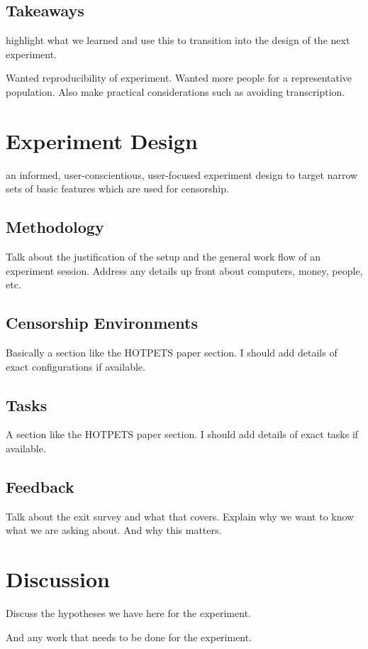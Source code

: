 \documentclass{sig-alternate-hotpets15}
\begin{document}
\subsection{Takeaways} 
highlight what we learned and use this to transition into 
the design of the next experiment. 

Wanted reproducibility of experiment.
Wanted more people for a representative population. 
Also make practical considerations such as avoiding transcription. 

\section{Experiment Design} 
an informed, user-conscientious, user-focused experiment design to target 
narrow sets of basic features which are used for censorship. 

\subsection{Methodology}  
Talk about the justification of the setup and the general 
work flow of an experiment session. Address any details up front
about computers, money, people, etc. 

\subsection{Censorship Environments} 
Basically a section like the HOTPETS paper section.
I should add details of exact configurations if available. 

\subsection{Tasks}
A section like the HOTPETS paper section. 
I  should add details of exact tasks if available.

\subsection{Feedback} 
Talk about the exit survey and what that covers. 
Explain why we want to know what we are asking about. 
And why this matters. 

\section{Discussion} 
Discuss the hypotheses we have here for the experiment. 

And any work that needs to be done for the experiment. 
\end{document}
